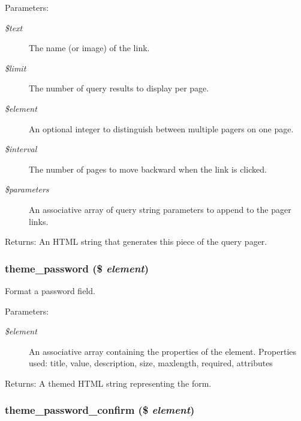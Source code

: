 \begin{Desc}
\item[Parameters:]
\begin{description}
\item[{\em \$text}]The name (or image) of the link. \item[{\em \$limit}]The number of query results to display per page. \item[{\em \$element}]An optional integer to distinguish between multiple pagers on one page. \item[{\em \$interval}]The number of pages to move backward when the link is clicked. \item[{\em \$parameters}]An associative array of query string parameters to append to the pager links. \end{description}
\end{Desc}
\begin{Desc}
\item[Returns:]An HTML string that generates this piece of the query pager. \end{Desc}
\hypertarget{group__themeable_g50dff4269f6095aedc025e9a48304515}{
\subsubsection[{theme\_\-password}]{\setlength{\rightskip}{0pt plus 5cm}theme\_\-password (\$ {\em element})}}
\label{group__themeable_g50dff4269f6095aedc025e9a48304515}


Format a password field.

\begin{Desc}
\item[Parameters:]
\begin{description}
\item[{\em \$element}]An associative array containing the properties of the element. Properties used: title, value, description, size, maxlength, required, attributes \end{description}
\end{Desc}
\begin{Desc}
\item[Returns:]A themed HTML string representing the form. \end{Desc}
\hypertarget{group__themeable_g5a4796f142665416c8dc871dca424288}{
\subsubsection[{theme\_\-password\_\-confirm}]{\setlength{\rightskip}{0pt plus 5cm}theme\_\-password\_\-confirm (\$ {\em element})}}
\label{group__themeable_g5a4796f142665416c8dc871dca424288}


